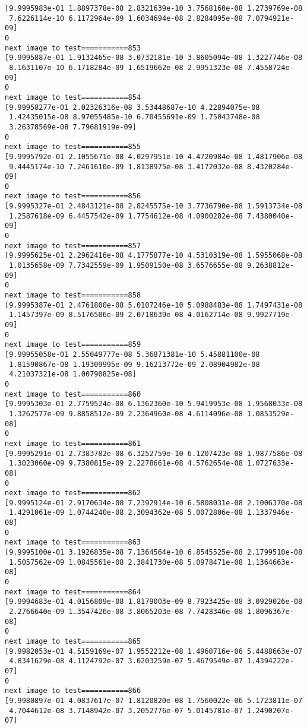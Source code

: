 \documentclass[11pt]{article}
\begin{document}
\begin{Verbatim}[commandchars=\\\{\}]
[9.9995983e-01 1.8897378e-08 2.8321639e-10 3.7568160e-08 1.2739769e-08
 7.6226114e-10 6.1172964e-09 1.6034694e-08 2.8284095e-08 7.0794921e-09]
0
next image to test===========853
[9.9995887e-01 1.9132465e-08 3.0732181e-10 3.8605094e-08 1.3227746e-08
 8.1631107e-10 6.1718284e-09 1.6519662e-08 2.9951323e-08 7.4558724e-09]
0
next image to test===========854
[9.99958277e-01 2.02326316e-08 3.53448687e-10 4.22894075e-08
 1.42435015e-08 8.97055485e-10 6.70455691e-09 1.75043748e-08
 3.26378569e-08 7.79681919e-09]
0
next image to test===========855
[9.9995792e-01 2.1055671e-08 4.0297951e-10 4.4720984e-08 1.4817906e-08
 9.4445174e-10 7.2461610e-09 1.8138975e-08 3.4172032e-08 8.4320284e-09]
0
next image to test===========856
[9.9995327e-01 2.4843121e-08 2.8245575e-10 3.7736790e-08 1.5913734e-08
 1.2587618e-09 6.4457542e-09 1.7754612e-08 4.0900282e-08 7.4380040e-09]
0
next image to test===========857
[9.9995625e-01 2.2962416e-08 4.1775877e-10 4.5310319e-08 1.5955068e-08
 1.0135658e-09 7.7342559e-09 1.9509150e-08 3.6576655e-08 9.2638812e-09]
0
next image to test===========858
[9.9995387e-01 2.4761800e-08 5.0107246e-10 5.0988483e-08 1.7497431e-08
 1.1457397e-09 8.5176506e-09 2.0718639e-08 4.0162714e-08 9.9927719e-09]
0
next image to test===========859
[9.99955058e-01 2.55049777e-08 5.36871381e-10 5.45881100e-08
 1.81590867e-08 1.19309995e-09 9.16213772e-09 2.08904982e-08
 4.21037321e-08 1.00790825e-08]
0
next image to test===========860
[9.9995303e-01 2.7759524e-08 6.1362360e-10 5.9419953e-08 1.9568033e-08
 1.3262577e-09 9.8858512e-09 2.2364960e-08 4.6114096e-08 1.0853529e-08]
0
next image to test===========861
[9.9995291e-01 2.7383782e-08 6.3252759e-10 6.1207423e-08 1.9877586e-08
 1.3023060e-09 9.7380815e-09 2.2278661e-08 4.5762654e-08 1.0727633e-08]
0
next image to test===========862
[9.9995124e-01 2.9170634e-08 7.2392914e-10 6.5808031e-08 2.1006370e-08
 1.4291061e-09 1.0744240e-08 2.3094362e-08 5.0072806e-08 1.1337946e-08]
0
next image to test===========863
[9.9995100e-01 3.1926835e-08 7.1364564e-10 6.8545525e-08 2.1799510e-08
 1.5057562e-09 1.0845561e-08 2.3841730e-08 5.0978471e-08 1.1364663e-08]
0
next image to test===========864
[9.9994683e-01 4.0156809e-08 1.8179003e-09 8.7923425e-08 3.0929026e-08
 2.2766640e-09 1.3547426e-08 3.8065203e-08 7.7428346e-08 1.8096367e-08]
0
next image to test===========865
[9.9982053e-01 4.5159169e-07 1.9552212e-08 1.4960716e-06 5.4488663e-07
 4.8341629e-08 4.1124792e-07 3.0203259e-07 5.4679549e-07 1.4394222e-07]
0
next image to test===========866
[9.9980897e-01 4.0837617e-07 1.8120820e-08 1.7560022e-06 5.1723811e-07
 4.7044612e-08 3.7148942e-07 3.2052776e-07 5.0145781e-07 1.2490207e-07]

\end{Verbatim}
\end{document}
